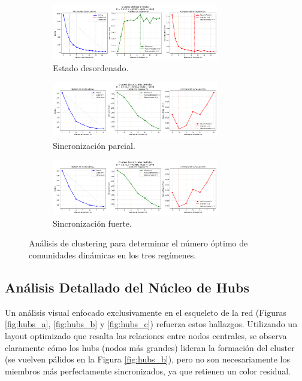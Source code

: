 \documentclass[12pt, a4paper]{article}
\begin{document}
\begin{figure}[htbp]
    \centering
    \begin{subfigure}[b]{\textwidth}
        \centering
        \includegraphics[width=0.8\textwidth]{img/2_1.png}
        \caption{Estado desordenado.}
    \end{subfigure}
    \begin{subfigure}[b]{\textwidth}
        \centering
        \includegraphics[width=0.8\textwidth]{img/2_3.png}
        \caption{Sincronización parcial.}
    \end{subfigure}
    \begin{subfigure}[b]{\textwidth}
        \centering
        \includegraphics[width=0.8\textwidth]{img/2_5.png}
        \caption{Sincronización fuerte.}
    \end{subfigure}
    \caption{Análisis de clustering para determinar el número óptimo de comunidades dinámicas en los tres regímenes.}
    \label{fig:clustering}
\end{figure}


\subsection{Análisis Detallado del Núcleo de Hubs}
Un análisis visual enfocado exclusivamente en el esqueleto de la red (Figuras \ref{fig:hubs_a}, \ref{fig:hubs_b} y \ref{fig:hubs_c}) refuerza estos hallazgos. Utilizando un layout optimizado que resalta las relaciones entre nodos centrales, se observa claramente cómo los hubs (nodos más grandes) lideran la formación del cluster (se vuelven pálidos en la Figura \ref{fig:hubs_b}), pero no son necesariamente los miembros más perfectamente sincronizados, ya que retienen un color residual.
\end{document}
